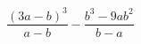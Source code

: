 \begin{ex}[type=expression]
	\begin{condition}
		\( \dfrac{(3a-b)^3}{a-b}-\dfrac{b^3-9ab^2}{b-a} \)
	\end{condition}
\end{ex}